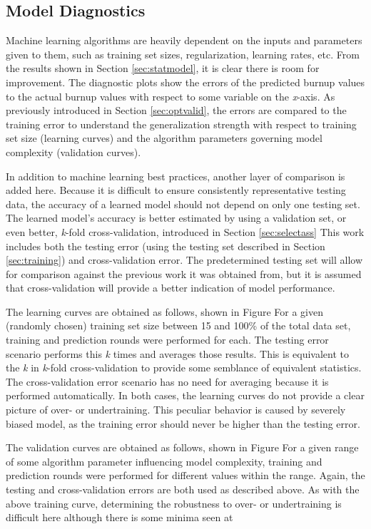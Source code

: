 \subsection{Model Diagnostics}
\label{sec:algeval}

Machine learning algorithms are heavily dependent on the inputs and parameters
given to them, such as training set sizes, regularization, learning rates, etc.
From the results shown in Section \ref{sec:statmodel}, it is clear there is
room for improvement.  The diagnostic plots show the errors of the predicted
burnup values to the actual burnup values with respect to some variable on the
\textit{x}-axis.  As previously introduced in Section \ref{sec:optvalid}, the
errors are compared to the training error to understand the generalization
strength with respect to training set size (learning curves) and the algorithm
parameters governing model complexity (validation curves). 

In addition to machine learning best practices, another layer of comparison is
added here.  Because it is difficult to ensure consistently representative
testing data, the accuracy of a learned model should not depend on only one
testing set.  The learned model's accuracy is better estimated by using a
validation set, or even better, \textit{k}-fold cross-validation, introduced in
Section \ref{sec:selectass} This work includes both the testing error (using
the testing set described in Section \ref{sec:training}) and cross-validation
error. The predetermined testing set will allow for comparison against the
previous work it was obtained from, but it is assumed that cross-validation
will provide a better indication of model performance.

The learning curves are obtained as follows, shown in Figure %
For a given (randomly chosen) training set size between 15 and 100\% of the
total data set, training and prediction rounds were performed for each. The
testing error scenario performs this \textit{k} times and averages those
results.  This is equivalent to the \textit{k} in \textit{k}-fold
cross-validation to provide some semblance of equivalent statistics.  The
cross-validation error scenario has no need for averaging because it is
performed automatically.  In both cases, the learning curves do not provide a
clear picture of over- or undertraining. This peculiar behavior is caused by
severely biased model, as the training error should never be higher than the
testing error.

The validation curves are obtained as follows, shown in Figure %
For a given range of some algorithm parameter influencing model complexity,
training and prediction rounds were performed for different values within the
range.  Again, the testing and cross-validation errors are both used as
described above. As with the above training curve, determining the robustness
to over- or undertraining is difficult here although there is some minima seen
at 

